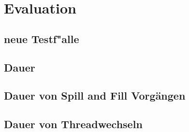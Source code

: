 \chapter{Evaluation}
\label{cha:Evaluation}

\section{neue Testf"alle}
\section{Dauer }
\section{Dauer von Spill and Fill Vorg\"angen}
\section{Dauer von Threadwechseln}